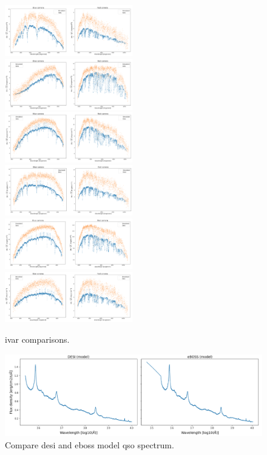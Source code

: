 \begin{figure}[h]
    \centering
    \includegraphics[width=0.495\textwidth]{images/specsim/ivar_4055_55359_334.png}
    \includegraphics[width=0.495\textwidth]{images/specsim/ivar_4055_55359_395.png}
    \includegraphics[width=0.495\textwidth]{images/specsim/ivar_4055_55359_41.png}
     \includegraphics[width=0.495\textwidth]{images/specsim/ivar_4055_55359_694.png}
      \includegraphics[width=0.495\textwidth]{images/specsim/ivar_4055_55359_890.png}
       \includegraphics[width=0.495\textwidth]{images/specsim/ivar_4055_55359_970.png}
    \caption{ivar comparisons.}
    \label{fig:ivar}
\end{figure}

\begin{figure}[h]
\centering
\includegraphics[width=16cm]{images/specsim/model_comparison.png}
\caption{Compare desi and eboss model qso spectrum.}
\label{fig:model_comparison}
\end{figure}

